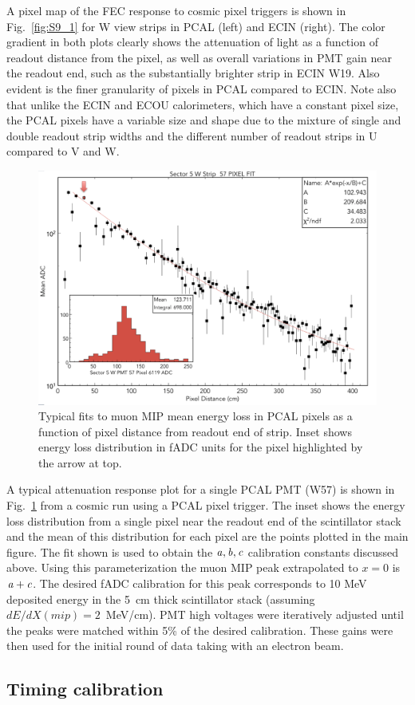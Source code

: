 A pixel map of the FEC response to cosmic pixel triggers is shown in Fig.~\ref{fig:S9_1} for W view strips in PCAL (left) and ECIN (right). The color gradient in both plots clearly shows the attenuation of light as a function of readout distance from the pixel, as well as overall variations in PMT gain near the readout end, such as the substantially brighter strip in ECIN W19.  Also evident is the finer granularity of pixels in PCAL compared to ECIN.  Note also that unlike the ECIN and ECOU calorimeters, which have a constant pixel size, the PCAL pixels have a variable size and shape due to the mixture of single and double readout strip widths and the different number of readout strips in U compared to V and W. 
\begin{figure}[hbt]
\centering
\includegraphics[width=1.0\columnwidth,keepaspectratio]{img/S9_2.png}
\caption[]{Typical fits to muon MIP mean energy loss in PCAL pixels as a function of pixel distance from readout end of strip. Inset shows energy loss distribution in fADC units for the pixel highlighted by the arrow at top.}
\label{fig:S9_2}
\end{figure}

A typical attenuation response plot for a single PCAL PMT (W57) is shown in Fig.~\ref{fig:S9_2} from a cosmic run using a PCAL pixel trigger.  The inset shows the energy loss distribution from a single pixel near the readout end of the scintillator stack and the mean of this distribution for each pixel are the points plotted in the main figure.  The fit shown is used to obtain the $\it{a,b,c}$ calibration constants discussed above.  Using this parameterization the muon MIP peak extrapolated to $x=0$ is $\it{a+c}$.   The desired fADC calibration for this peak corresponds to 10 MeV deposited energy in the 5~cm thick scintillator stack (assuming $dE/dX(mip)=2$~MeV/cm).  PMT high voltages were iteratively adjusted until the peaks were matched within 5\% of the desired calibration.   These gains were then used for the initial round of data taking with an electron beam.

\subsection{Timing calibration}




